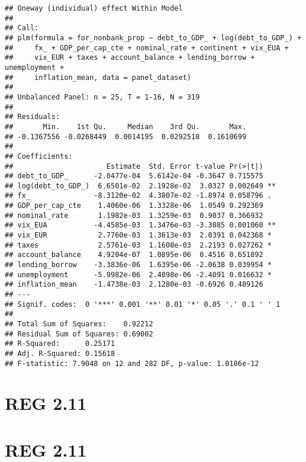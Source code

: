 \documentclass[]{article}
\begin{document}
\begin{verbatim}
## Oneway (individual) effect Within Model
## 
## Call:
## plm(formula = for_nonbank_prop ~ debt_to_GDP_ + log(debt_to_GDP_) + 
##     fx_ + GDP_per_cap_cte + nominal_rate + continent + vix_EUA + 
##     vix_EUR + taxes + account_balance + lending_borrow + unemployment + 
##     inflation_mean, data = panel_dataset)
## 
## Unbalanced Panel: n = 25, T = 1-16, N = 319
## 
## Residuals:
##       Min.    1st Qu.     Median    3rd Qu.       Max. 
## -0.1367556 -0.0268449  0.0014195  0.0292518  0.1610699 
## 
## Coefficients:
##                      Estimate  Std. Error t-value Pr(>|t|)   
## debt_to_GDP_      -2.0477e-04  5.6142e-04 -0.3647 0.715575   
## log(debt_to_GDP_)  6.6501e-02  2.1928e-02  3.0327 0.002649 **
## fx_               -8.3120e-02  4.3807e-02 -1.8974 0.058796 . 
## GDP_per_cap_cte    1.4060e-06  1.3328e-06  1.0549 0.292369   
## nominal_rate       1.1982e-03  1.3259e-03  0.9037 0.366932   
## vix_EUA           -4.4585e-03  1.3476e-03 -3.3085 0.001060 **
## vix_EUR            2.7760e-03  1.3613e-03  2.0391 0.042368 * 
## taxes              2.5761e-03  1.1608e-03  2.2193 0.027262 * 
## account_balance    4.9204e-07  1.0895e-06  0.4516 0.651892   
## lending_borrow    -3.3836e-06  1.6395e-06 -2.0638 0.039954 * 
## unemployment      -5.9982e-06  2.4898e-06 -2.4091 0.016632 * 
## inflation_mean    -1.4738e-03  2.1280e-03 -0.6926 0.489126   
## ---
## Signif. codes:  0 '***' 0.001 '**' 0.01 '*' 0.05 '.' 0.1 ' ' 1
## 
## Total Sum of Squares:    0.92212
## Residual Sum of Squares: 0.69002
## R-Squared:      0.25171
## Adj. R-Squared: 0.15618
## F-statistic: 7.9048 on 12 and 282 DF, p-value: 1.0186e-12
\end{verbatim}

\section{REG 2.11}\label{reg-2.11}

\section{REG 2.11}\label{reg-2.11-1}
\end{document}
